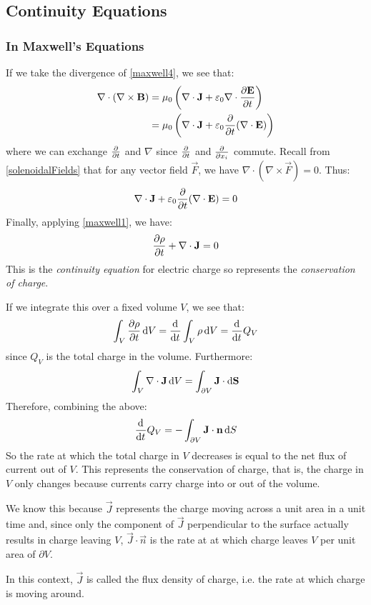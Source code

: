 \documentclass[../main.tex]{subfiles}
\begin{document}
\subsection{Continuity Equations}
\subsubsection{In Maxwell's Equations}
If we take the divergence of \cref{maxwell4}, we see that:
\begin{align*}
  \nabla \cdot (\nabla \times \vec{B}) &= \mu_0\left(\nabla \cdot \vec{J} + \varepsilon_0 \nabla \cdot \pderiv{\vec{E}}{t}\right) \\
                                       &= \mu_0\left(\nabla \cdot \vec{J} + \varepsilon_0 \pderiv{}{t}(\nabla \cdot \vec{E})\right)
\end{align*}
where we can exchange $\pderiv{}{t}$ and $\nabla$ since $\pderiv{}{t}$ and $\pderiv{}{x_i}$ commute.
Recall from \cref{solenoidalFields} that for any vector field $\vec{F}$, we have $\nabla \cdot (\nabla \times \vec{F}) = 0$.
Thus:
\[
  \nabla \cdot \vec{J} + \varepsilon_0 \pderiv{}{t}(\nabla \cdot \vec{E}) = 0
\]
Finally, applying \cref{maxwell1}, we have:
\begin{equation}
  \pderiv{\rho}{t} + \nabla \cdot \vec{J} = 0 \label{maxwellContinuity}
\end{equation}
This is the \textit{continuity equation} for electric charge so represents the \textit{conservation of charge}.

If we integrate this over a fixed volume $V$, we see that:
\[
  \int_{V} \pderiv{\rho}{t} \d{V} = \deriv{}{t} \int_{V} \rho \d{V}  = \deriv{}{t}Q_V
\]
since $Q_V$ is the total charge in the volume.
Furthermore:
\[
  \int_{V} \nabla \cdot \vec{J} \d{V} = \int_{\partial V} \vec{J} \cdot \d{\vec{S}}
\]
Therefore, combining the above:
\[
  \deriv{}{t}Q_V = - \int_{\partial V} \vec{J} \cdot \vec{n} \d{S}
\]
So the rate at which the total charge in $V$ decreases is equal to the net flux of current out of $V$.
This represents the conservation of charge, that is, the charge in $V$ only changes because currents carry charge into or out of the volume.

We know this because $\vec{J}$ represents the charge moving across a unit area in a unit time and, since only the component of $\vec{J}$ perpendicular to the surface actually results in charge leaving $V$, $\vec{J} \cdot \vec{n}$ is the rate at at which charge leaves $V$ per unit area of $\partial V$.

In this context, $\vec{J}$ is called the flux density of charge, i.e. the rate at which charge is moving around.
\end{document}
